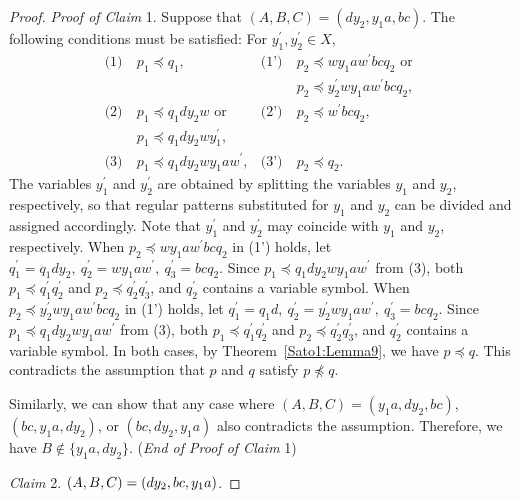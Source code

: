 \begin{proof}
  \smallskip
  \noindent
  \textit{Proof of Claim} 1.
  Suppose that $(A, B, C) = (dy_{2}, y_{1}a, bc)$. The following conditions must be satisfied: For $y_{1}^{\prime},y_{2}^{\prime}\in X$, 
  \begin{align*}
    \textrm{(1)}~& p_{1} \preceq q_{1}, & \textrm{(1')}~& p_{2} \preceq wy_{1}aw^{\prime}bcq_{2}\mbox{ or } \\
    & & & p_{2} \preceq y_{2}^{\prime}wy_{1}aw^{\prime}bcq_{2},\\
    \textrm{(2)}~& p_{1} \preceq q_{1}dy_{2}w\mbox{ or }  & \textrm{(2')}~& p_{2} \preceq w^{\prime}bcq_{2},\\
    & p_{1} \preceq q_{1}dy_{2}wy_{1}^{\prime}, & & \\
    \textrm{(3)}~& p_{1} \preceq q_{1}dy_{2}wy_{1}aw^{\prime}, & \textrm{(3')}~& p_{2} \preceq q_{2}.
  \end{align*}
  {\color{black}The variables $y_{1}^{\prime}$ and $y_{2}^{\prime}$ are obtained by splitting the variables $y_{1}$ and $y_{2}$, respectively, so that regular patterns substituted for $y_{1}$ and $y_{2}$ can be divided and assigned accordingly.  
  Note that $y_{1}^{\prime}$ and $y_{2}^{\prime}$ may coincide with $y_{1}$ and $y_{2}$, respectively.}
  When $p_{2} \preceq wy_{1}aw^{\prime}bcq_{2}$ in (1') holds, let $q^{\prime}_{1}=q_{1}dy_{2},~q^{\prime}_{2}=wy_{1}aw^{\prime},~q^{\prime}_{3}=bcq_{2}$.
  Since $p_{1} \preceq q_{1}dy_{2}wy_{1}aw^{\prime}$ from (3), both $p_{1} \preceq q^{\prime}_{1}q^{\prime}_{2}$ and $p_{2} \preceq q^{\prime}_{2}q^{\prime}_{3}$, and $q_{2}^{\prime}$ contains a variable symbol.
  When $p_{2} \preceq y_{2}^{\prime}wy_{1}aw^{\prime}bcq_{2}$ in (1') holds, let $q^{\prime}_{1}=q_{1}d,~q^{\prime}_{2}=y_{2}^{\prime}wy_{1}aw^{\prime},~q^{\prime}_{3}=bcq_{2}$.
  Since $p_{1} \preceq q_{1}dy_{2}wy_{1}aw^{\prime}$  from (3), both $p_{1} \preceq q^{\prime}_{1}q^{\prime}_{2}$ and $p_{2} \preceq q^{\prime}_{2}q^{\prime}_{3}$, and $q_{2}^{\prime}$ contains a variable symbol.
  In both cases, by Theorem~\ref{Sato1:Lemma9}, {\color{black} we have} $p \preceq q$.
  {\color{black}This contradicts the assumption that $p$ and $q$ satisfy 
  $p\not\preceq q$.}

  Similarly, we can show that any case where $(A, B, C) = (y_{1}a, dy_{2}, bc)$, $(bc, y_{1}a, dy_{2})$, or $(bc, dy_{2}, y_{1}a)$ also contradicts the assumption.
  Therefore, we have $B \not\in \{y_{1}a, dy_{2}\}$. (\textit{End of Proof of Claim} 1)

  \smallskip

  \noindent
  \textit{Claim} 2. $(A, B, C) = (\mbox{\color{black} $dy_{2}, bc, y_{1}a$})$.


\end{proof}
